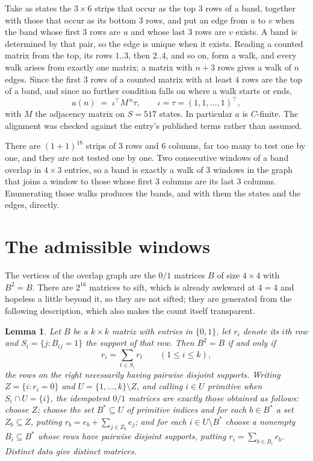 \documentclass[11pt,a4paper]{article}
\theoremstyle{plain}
\newtheorem{lemma}[theorem]{Lemma}
\theoremstyle{definition}
\begin{document}
Take as states the $3\times6$ strips that occur as the top $3$ rows of a band,
together with those that occur as its bottom $3$ rows, and put an edge from $u$ to $v$
when the band whose first $3$ rows are $u$ and whose last $3$ rows are $v$ exists.
A band is determined by that pair, so the edge is unique when it exists. Reading a counted
matrix from the top, its rows $1..3$, then $2..4$, and so on, form a walk, and every
walk arises from exactly one matrix; a matrix with $n+3$ rows gives a walk of $n$ edges.
Since the first $3$ rows of a counted matrix with at least $4$ rows are the top of a
band, and since no further condition falls on where a walk starts or ends,
\[
a(n)\;=\;\iota^{\!\top}M^{\,n}\tau ,\qquad \iota=\tau=(1,1,\dots,1)^{\!\top},
\]
with $M$ the adjacency matrix on $S=517$ states. In particular $a$ is $C$-finite. The
alignment was checked against the entry's published terms rather than assumed.

There are $(1 + 1)^{18}$ strips of $3$ rows and $6$ columns, far too
many to test one by one, and they are not tested one by one. Two consecutive windows of a band
overlap in $4\times3$ entries, so a band is exactly a walk of $3$ windows in
the graph that joins a window to those whose first $3$ columns are its last $3$
columns. Enumerating those walks produces the bands, and with them the states and the edges,
directly.

\section{The admissible windows}

The vertices of the overlap graph are the $0/1$ matrices $B$ of size $4\times4$ with
$B^2=B$. There are $2^{16}$ matrices to sift, which is already awkward at $4=4$ and
hopeless a little beyond it, so they are not sifted; they are generated from the following
description, which also makes the count itself transparent.

\begin{lemma}\label{lem:idem}
Let $B$ be a $k\times k$ matrix with entries in $\{0,1\}$, let $r_i$ denote its $i$th row and
$S_i=\{j:B_{ij}=1\}$ the support of that row. Then $B^2=B$ if and only if
\[
r_i=\sum_{t\in S_i}r_t \qquad (1\le i\le k),
\]
the rows on the right necessarily having pairwise disjoint supports. Writing
$Z=\{i:r_i=0\}$ and $U=\{1,\dots,k\}\setminus Z$, and calling $i\in U$ \emph{primitive}
when $S_i\cap U=\{i\}$, the idempotent $0/1$ matrices are exactly those obtained as follows:
choose $Z$; choose the set $B^{\ast}\subseteq U$ of primitive indices and for each
$b\in B^{\ast}$ a set $Z_b\subseteq Z$, putting $r_b=e_b+\sum_{j\in Z_b}e_j$; and for each
$i\in U\setminus B^{\ast}$ choose a nonempty $B_i\subseteq B^{\ast}$ whose rows have
pairwise disjoint supports, putting $r_i=\sum_{b\in B_i}r_b$. Distinct data give distinct
matrices.
\end{lemma}
\end{document}
